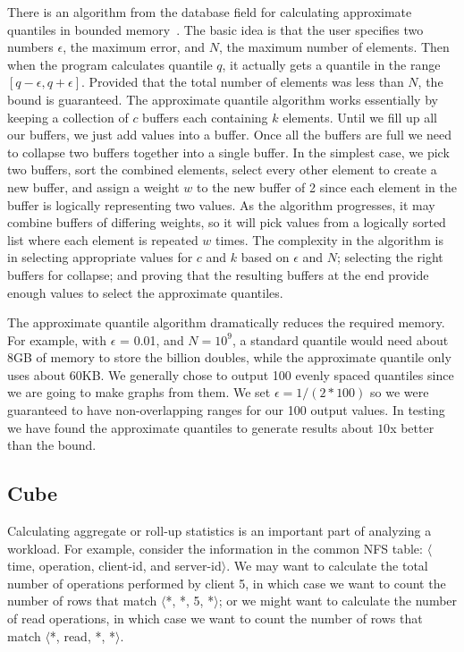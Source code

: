 There is an algorithm from the database field for calculating
approximate quantiles in bounded
memory~\cite{Manku98approximatemedians}.  The basic idea is that the
user specifies two numbers $\epsilon$, the maximum error, and $N$, the
maximum number of elements.  Then when the program calculates quantile
$q$, it actually gets a quantile in the range
$[q-\epsilon,q+\epsilon]$.  Provided that the total number of elements
was less than $N$, the bound is guaranteed.  The approximate quantile
algorithm works essentially by keeping a collection of $c$ buffers
each containing $k$ elements.  Until we fill up all our buffers, we
just add values into a buffer.  Once all the buffers are full we need
to collapse two buffers together into a single buffer.  In the
simplest case, we pick two buffers, sort the combined elements, select
every other element to create a new buffer, and assign a weight $w$ to
the new buffer of 2 since each element in the buffer is logically
representing two values.  As the algorithm progresses, it may combine
buffers of differing weights, so it will pick values from a logically
sorted list where each element is repeated $w$ times.  The complexity
in the algorithm is in selecting appropriate values for $c$ and $k$
based on $\epsilon$ and $N$; selecting the right buffers for collapse;
and proving that the resulting buffers at the end provide enough
values to select the approximate quantiles.

The approximate quantile algorithm dramatically reduces the required
memory.  For example, with $\epsilon$ = 0.01, and $N = 10^9$, a
standard quantile would need about 8GB of memory to store the billion
doubles, while the approximate quantile only uses about 60KB.  We
generally chose to output 100 evenly spaced quantiles since we are
going to make graphs from them.  We set $\epsilon = 1/(2*100)$ so we
were guaranteed to have non-overlapping ranges for our 100 output
values.  In testing we have found the approximate quantiles to
generate results about $10$x better than the bound.

\subsection{Cube}

Calculating aggregate or roll-up statistics is an important part of
analyzing a workload.  For example, consider the information in the
common NFS table: $\langle$time, operation, client-id, and
server-id$\rangle$.  We may want to calculate the total number of
operations performed by client 5, in which case we want to count the
number of rows that match $\langle$*, *, 5, *$\rangle$; or we might
want to calculate the number of read operations, in which case we want
to count the number of rows that match $\langle$*, read, *,
*$\rangle$.

